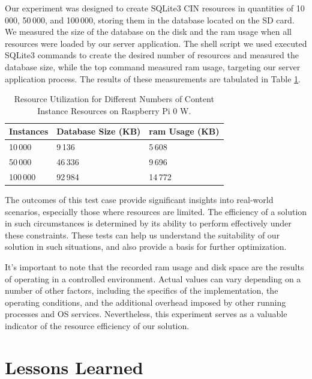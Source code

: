\documentclass[a4paper,fleqn]{cas-dc}
\begin{document}
Our experiment was designed to create SQLite3 CIN resources in quantities of 10\,000, 50\,000, and 100\,000, storing them in the database located on the SD card. We measured the size of the database on the disk and the \gls{ram} usage when all resources were loaded by our server application. The shell script we used executed SQLite3 commands to create the desired number of resources and measured the database size, while the top command measured \gls{ram} usage, targeting our server application process. The results of these measurements are tabulated in Table \ref{tab:ResourceUtilization}.

\begin{table}[h]
\scriptsize
\centering
\caption{Resource Utilization for Different Numbers of Content Instance Resources on Raspberry Pi 0 W.}
\label{tab:ResourceUtilization}
\begin{tabular}{ p{1.5cm} p{2.5cm} p{2.5cm} }
\hline
\textbf{Instances} & \textbf{Database Size (KB)} & \textbf{\gls{ram} Usage (KB)} \\
\hline \hline
10\,000 & 9\,136 & 5\,608 \\
50\,000 & 46\,336 & 9\,696 \\
100\,000 & 92\,984 & 14\,772 \\
\hline
\end{tabular}
\end{table}

The outcomes of this test case provide significant insights into real-world scenarios, especially those where resources are limited. The efficiency of a solution in such circumstances is determined by its ability to perform effectively under these constraints. These tests can help us understand the suitability of our solution in such situations, and also provide a basis for further optimization.

It's important to note that the recorded \gls{ram} usage and disk space are the results of operating in a controlled environment. Actual values can vary depending on a number of other factors, including the specifics of the implementation, the operating conditions, and the additional overhead imposed by other running processes and OS services. Nevertheless, this experiment serves as a valuable indicator of the resource efficiency of our solution.

\section{Lessons Learned}
\label{sec:lessonsLearned}
\end{document}

